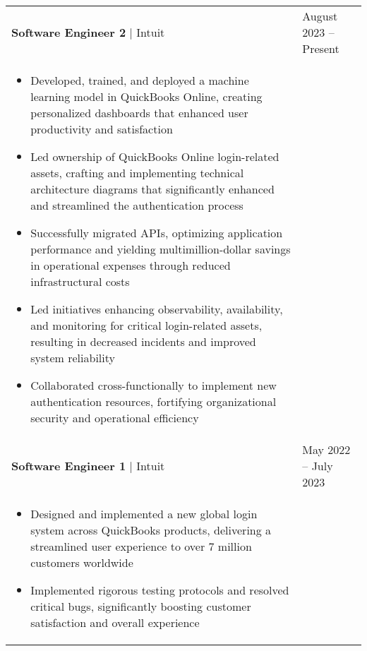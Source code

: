 \documentclass[11pt]{article}
\newenvironment{compactList}
{
  \begin{itemize}
    \setlength{\itemsep}{0pt}
    \setlength{\parskip}{0pt}
}
{\end{itemize}}
\begin{document}
\begin{tabularx}{\textwidth\setlength{\extrarowheight}{5pt}}
  {
    >{\hsize=1.5\hsize\raggedright\arraybackslash}X
    >{\hsize=0.5\hsize\raggedleft\arraybackslash}X
  }
  \textbf{Software Engineer 2} $\vert$ Intuit                            & August 2023 – Present     \\
  \multicolumn{2}{>{\hsize=\dimexpr2\hsize+2\tabcolsep+\arrayrulewidth\relax}X}
  {
    \begin{minipage}{0.85\paperwidth}
      \begin{compactList}
        \item Developed, trained, and deployed a machine learning model in QuickBooks Online, creating personalized dashboards that enhanced user productivity and satisfaction
        \item Led ownership of QuickBooks Online login-related assets, crafting and implementing technical architecture diagrams that significantly enhanced and streamlined the authentication process
        \item Successfully migrated APIs, optimizing application performance and yielding multimillion-dollar savings in operational expenses through reduced infrastructural costs
        \item Led initiatives enhancing observability, availability, and monitoring for critical login-related assets, resulting in decreased incidents and improved system reliability
        \item Collaborated cross-functionally to implement new authentication resources, fortifying organizational security and operational efficiency
      \end{compactList}
    \end{minipage}
  }
  \\
  \textbf{Software Engineer 1} $\vert$ Intuit                            & May 2022 – July 2023     \\
  \multicolumn{2}{>{\hsize=\dimexpr2\hsize+2\tabcolsep+\arrayrulewidth\relax}X}
  {
    \begin{minipage}{0.85\paperwidth}
      \begin{compactList}
        \item Designed and implemented a new global login system across QuickBooks products, delivering a streamlined user experience to over 7 million customers worldwide
        \item Implemented rigorous testing protocols and resolved critical bugs, significantly boosting customer satisfaction and overall experience

\end{compactList}
\end{minipage}}
\end{tabularx}
\end{document}
